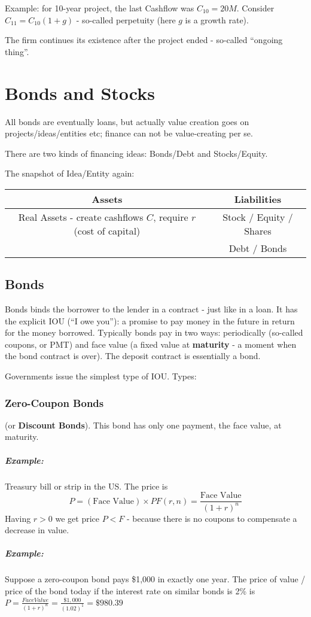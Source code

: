\documentclass{scrartcl}
\newcommand{\example}{\subparagraph{Example:}} %
\begin{document}
Example: for 10-year project, the last Cashflow was $C_{10} = 20M$. Consider
$C_{11} = C_{10}(1+g)$ - so-called perpetuity (here $g$ is a growth rate).


The firm continues its existence after the project ended - so-called ``ongoing
thing''.

\section{Bonds and Stocks}
\label{sec:BondsAndStocksDef}

All bonds are eventually loans, but actually value creation goes on
projects/ideas/entities etc; finance can not be value-creating per se.

There are two kinds of financing ideas: Bonds/Debt and Stocks/Equity.

The snapshot of Idea/Entity again:

\begin{tabular}{|c|c|} \hline Assets & Liabilities \\ \hline Real Assets -
  create cashflows $C$, require $r$ (cost of capital) & Stock / Equity / Shares
  \\ & Debt / Bonds \\ \hline \end{tabular}

\subsection{Bonds}
\label{sec:Bonds}

Bonds binds the borrower to the lender in a contract - just like in a loan. It
has the explicit IOU (``I owe you''): a promise to pay money in the future in
return for the money borrowed. Typically bonds pay in two ways: periodically
(so-called coupons, or PMT) and face value (a fixed value at {\bf maturity} - a
moment when the bond contract is over). The deposit contract is essentially a
bond.

Governments issue the simplest type of IOU. Types:
\subsubsection { Zero-Coupon Bonds} (or {\bf Discount Bonds}). This bond has
only one payment, the face value, at maturity.

\example Treasury bill or strip in the US.
The price is
$$P=(\text{Face Value}) \times PF(r, n) = \frac{\text{Face Value}}{(1+r)^n}$$
Having $r>0$ we get price $P<F$ - because there is no coupons to compensate a
decrease in value.
\example Suppose a zero-coupon bond pays \$1,000 in exactly one year. The price
of value / price of the bond today if the interest rate on similar bonds is 2\%
is $P=\frac{FaceValue}{(1+r)^n} = \frac{\$1,000}{(1.02)^1}=\$980.39$
\end{document}
